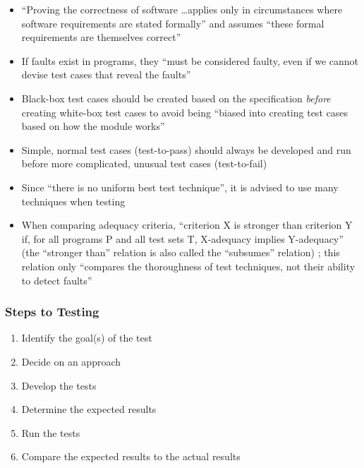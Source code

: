 \begin{itemize}
      \item ``Proving the correctness of software \dots applies only in
            circumstances where software requirements are stated formally'' and
            assumes ``these formal requirements are themselves correct''
            \cite[p.~398]{van_vliet_software_2000}
      \item If faults exist in programs, they ``must be considered faulty, even
            if we cannot devise test cases that reveal the faults''
            \cite[p.~401]{van_vliet_software_2000}
      \item Black-box test cases should be created based on the specification
            \emph{before} creating white-box test cases to avoid being ``biased
            into creating test cases based on how the module works''
            \cite[p.~113]{patton_software_2006}
      \item Simple, normal test cases (test-to-pass) should always be developed
            and run before more complicated, unusual test cases (test-to-fail)
            \cite[p.~66]{patton_software_2006}
      \item Since ``there is no uniform best test technique'', it is advised to
            use many techniques when testing \cite[p.~440]{van_vliet_software_2000}
      \item When comparing adequacy criteria, ``criterion X is stronger than
            criterion Y if, for all programs P and all test sets T, X-adequacy
            implies Y-adequacy'' (the ``stronger than'' relation is also called
            the ``subsumes'' relation) \cite[p.~432]{van_vliet_software_2000};
            this relation only ``compares the thoroughness of test techniques,
            not their ability to detect faults'' \cite[p.~434]{van_vliet_software_2000}
\end{itemize}

\subsubsection{Steps to Testing \cite[p.~443]{peters_software_2000}}
\begin{enumerate}
      \item Identify the goal(s) of the test
      \item Decide on an approach
      \item Develop the tests
      \item Determine the expected results
      \item Run the tests
      \item Compare the expected results to the actual results
\end{enumerate}


